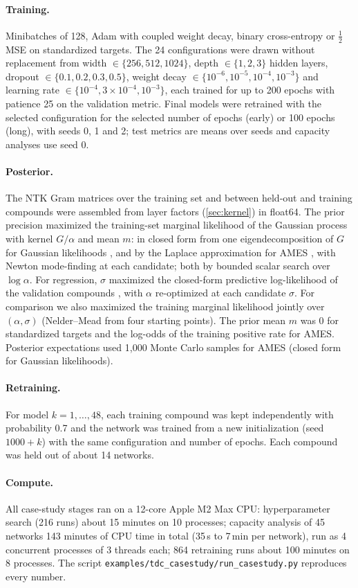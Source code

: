 \documentclass[10pt,twocolumn,letterpaper]{article}
\theoremstyle{definition}
\begin{document}
\paragraph{Training.} Minibatches of 128, Adam with coupled weight decay, binary cross-entropy or $\tfrac12$MSE on standardized targets. The 24 configurations were drawn without replacement from width $\in\{256,512,1024\}$, depth $\in\{1,2,3\}$ hidden layers, dropout $\in\{0.1,0.2,0.3,0.5\}$, weight decay $\in\{10^{-6},10^{-5},10^{-4},10^{-3}\}$ and learning rate $\in\{10^{-4},3\times10^{-4},10^{-3}\}$, each trained for up to 200 epochs with patience 25 on the validation metric. Final models were retrained with the selected configuration for the selected number of epochs (early) or 100 epochs (long), with seeds 0, 1 and 2; test metrics are means over seeds and capacity analyses use seed 0.

\paragraph{Posterior.} The NTK Gram matrices over the training set and between held-out and training compounds were assembled from layer factors (\cref{sec:kernel}) in float64. The prior precision maximized the training-set marginal likelihood of the Gaussian process with kernel $G/\alpha$ and mean $m$: in closed form from one eigendecomposition of $G$ for Gaussian likelihoods \citep[eq.~2.30]{rasmussen2006}, and by the Laplace approximation for AMES \citep[eq.~3.32]{rasmussen2006}, with Newton mode-finding at each candidate; both by bounded scalar search over $\log\alpha$. For regression, $\sigma$ maximized the closed-form predictive log-likelihood of the validation compounds \citep[eqs.~2.25--2.26]{rasmussen2006}, with $\alpha$ re-optimized at each candidate $\sigma$. For comparison we also maximized the training marginal likelihood jointly over $(\alpha,\sigma)$ (Nelder--Mead from four starting points). The prior mean $m$ was 0 for standardized targets and the log-odds of the training positive rate for AMES. Posterior expectations used 1{,}000 Monte Carlo samples for AMES (closed form for Gaussian likelihoods).

\paragraph{Retraining.} For model $k=1,\dots,48$, each training compound was kept independently with probability 0.7 and the network was trained from a new initialization (seed $1000+k$) with the same configuration and number of epochs. Each compound was held out of about 14 networks.

\paragraph{Compute.} All case-study stages ran on a 12-core Apple M2 Max CPU: hyperparameter search (216 runs) about 15 minutes on 10 processes; capacity analysis of 45 networks 143 minutes of CPU time in total (35\,s to 7\,min per network), run as 4 concurrent processes of 3 threads each; 864 retraining runs about 100 minutes on 8 processes. The script \texttt{examples/tdc\_casestudy/run\_casestudy.py} reproduces every number.
\end{document}
